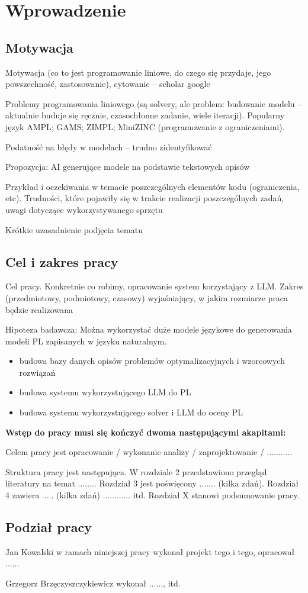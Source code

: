 
\chapter{Wprowadzenie}

\section{Motywacja}
Motywacja (co to jest programowanie liniowe, do czego się przydaje, jego powszechność, zastosowanie), cytowanie – scholar google

Problemy programowania liniowego (są solvery, ale problem: budowanie modelu – aktualnie buduje się ręcznie, czasochłonne zadanie, wiele iteracji). Popularny język AMPL; GAMS; ZIMPL; MiniZINC (programowanie z ograniczeniami).

Podatność na błędy w modelach – trudno zidentyfikować

Propozycja: AI generujące modele na podstawie tekstowych opisów

Przykład i oczekiwania w temacie poszczególnych elementów kodu (ograniczenia, etc). Trudności, które pojawiły się w trakcie 
    realizacji poszczególnych zadań, uwagi dotyczące wykorzystywanego sprzętu

Krótkie uzasadnienie podjęcia tematu

\section{Cel i zakres pracy}
Cel pracy. Konkretnie co robimy, opracowanie system korzystający z LLM. Zakres (przedmiotowy, podmiotowy, czasowy) wyjaśniający, w jakim rozmiarze praca będzie realizowana

Hipoteza badawcza: Można wykorzystać duże modele językowe do generowania modeli PL zapisanych w języku naturalnym.
\begin{itemize}
    \item budowa bazy danych opisów problemów optymalizacyjnych i wzorcowych rozwiązań
    \item budowa systemu wykorzystującego LLM do PL 
    \item budowa systemu wykorzystującego solver i LLM do oceny PL
\end{itemize}

\noindent
\textbf{Wstęp do pracy musi się kończyć dwoma następującymi akapitami:}

Celem pracy jest opracowanie / wykonanie analizy / zaprojektowanie / ...........

Struktura pracy jest następująca. W rozdziale 2 przedstawiono przegląd literatury na temat ........ 
Rozdział 3 jest poświęcony ....... (kilka zdań). 
Rozdział 4 zawiera ..... (kilka zdań) ............ itd. 
Rozdział X stanowi podsumowanie pracy. 


\section{Podział pracy}
Jan Kowalski w ramach niniejszej pracy wykonał projekt tego i tego, opracował ......

Grzegorz Brzęczyszczykiewicz wykonał ......, itd. 

